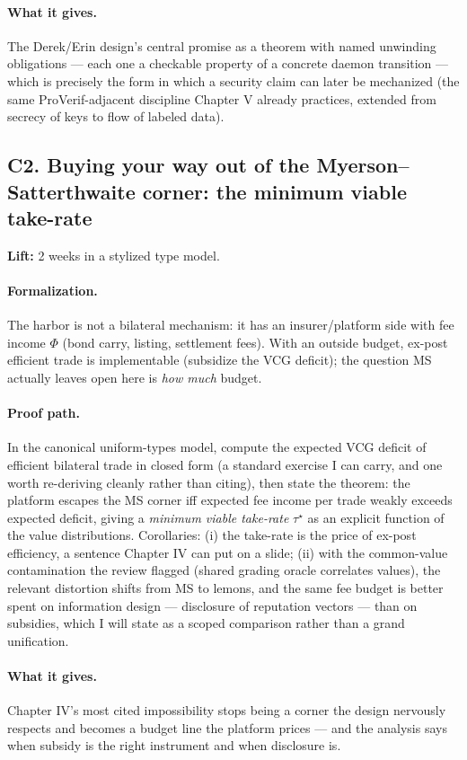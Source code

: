 \documentclass[11pt,a4paper]{article}
\newcommand{\lift}[1]{\noindent\textbf{Lift:} #1.}
\newcommand{\gives}{\paragraph{What it gives.}}
\newcommand{\form}{\paragraph{Formalization.}}
\newcommand{\proofpath}{\paragraph{Proof path.}}
\begin{document}
\gives The Derek/Erin design's central promise as a theorem with named unwinding obligations --- each one a checkable property of a concrete daemon transition --- which is precisely the form in which a security claim can later be mechanized (the same ProVerif-adjacent discipline Chapter V already practices, extended from secrecy of keys to flow of labeled data).

\subsection{C2. Buying your way out of the Myerson--Satterthwaite corner: the minimum viable take-rate}
\lift{2 weeks in a stylized type model}

\form The harbor is not a bilateral mechanism: it has an insurer/platform side with fee income $\Phi$ (bond carry, listing, settlement fees). With an outside budget, ex-post efficient trade is implementable (subsidize the VCG deficit); the question MS actually leaves open here is \emph{how much} budget.

\proofpath In the canonical uniform-types model, compute the expected VCG deficit of efficient bilateral trade in closed form (a standard exercise I can carry, and one worth re-deriving cleanly rather than citing), then state the theorem: the platform escapes the MS corner iff expected fee income per trade weakly exceeds expected deficit, giving a \emph{minimum viable take-rate} $\tau^\star$ as an explicit function of the value distributions. Corollaries: (i) the take-rate is the price of ex-post efficiency, a sentence Chapter IV can put on a slide; (ii) with the common-value contamination the review flagged (shared grading oracle correlates values), the relevant distortion shifts from MS to lemons, and the same fee budget is better spent on information design --- disclosure of reputation vectors --- than on subsidies, which I will state as a scoped comparison rather than a grand unification.

\gives Chapter IV's most cited impossibility stops being a corner the design nervously respects and becomes a budget line the platform prices --- and the analysis says when subsidy is the right instrument and when disclosure is.
\end{document}
